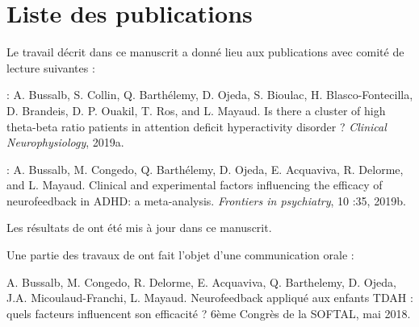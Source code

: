 \section{Liste des publications}

Le travail décrit dans ce manuscrit a donné lieu aux publications avec comité de lecture suivantes :

\begin{description}
\item \citet{Bussalb2019tbr} : A. Bussalb, S. Collin, Q. Barthélemy, D. Ojeda, S. Bioulac, H. Blasco-Fontecilla,
D. Brandeis, D. P. Ouakil, T. Ros, and L. Mayaud. Is there a cluster of high
theta-beta ratio patients in attention deficit hyperactivity disorder ? \textit{Clinical Neurophysiology}, 2019a.
\item \citet{Bussalb2019clinical} : A. Bussalb, M. Congedo, Q. Barthélemy, D. Ojeda, E. Acquaviva, R. Delorme,
and L. Mayaud. Clinical and experimental factors influencing the efficacy of
neurofeedback in ADHD: a meta-analysis. \textit{Frontiers in psychiatry}, 10 :35, 2019b.
\end{description}

Les résultats de \citet{Bussalb2019clinical} ont été mis à jour dans ce manuscrit.

Une partie des travaux de \citet{Bussalb2019clinical} ont fait l'objet d'une communication orale :

\noindent A. Bussalb, M. Congedo, R. Delorme, E. Acquaviva, Q. Barthelemy, D. Ojeda, J.A. Micoulaud-Franchi, L. Mayaud. Neurofeedback 
appliqué aux enfants TDAH : quels facteurs influencent son efficacité ? 6ème Congrès de la SOFTAL, mai 2018. 
